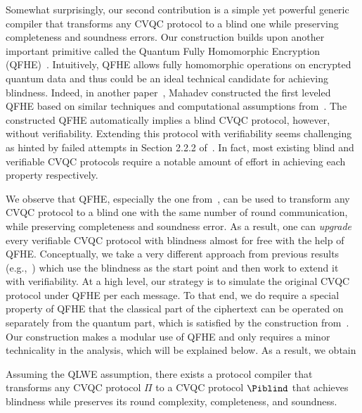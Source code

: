 Somewhat surprisingly, our second contribution is a simple yet powerful generic compiler that transforms any CVQC protocol to a blind one while preserving completeness and soundness errors.
Our construction builds upon another important primitive called the Quantum Fully Homomorphic Encryption (QFHE)~\cite{BJ15, DSS16, LC18, NS18, OTF18, mahadev_qfhe}.
Intuitively, QFHE allows fully homomorphic operations on encrypted quantum data and thus could be an ideal technical candidate for achieving blindness.
Indeed, in another paper~\cite{mahadev_qfhe}, Mahadev constructed the first leveled QFHE based on similar techniques and computational assumptions from~\cite{FOCS:Mahadev18a}.
The constructed QFHE automatically implies a blind CVQC protocol, however, without verifiability.
Extending this protocol with verifiability seems challenging as hinted by failed attempts in Section 2.2.2 of~\cite{mahadev_2018}.
In fact, most existing blind and verifiable CVQC protocols require a notable amount of effort in achieving each property respectively.

We observe that QFHE, especially the one from~\cite{mahadev_qfhe}, can be used to transform any CVQC protocol to a blind one with the same number of round communication, while preserving completeness and soundness error.
As a result, one can \emph{upgrade} every verifiable CVQC protocol with blindness almost for free with the help of QFHE.
Conceptually, we take a very different approach from previous results (e.g.,~\cite{FK17}) which use the blindness as the start point and then work to extend it with verifiability.
At a high level, our strategy is to simulate the original CVQC protocol under QFHE per each message.
To that end, we do require a special property of QFHE that the classical part of the ciphertext can be operated on separately from the quantum part, which is satisfied by the construction from~\cite{mahadev_qfhe}.
Our construction makes a modular use of QFHE and only requires a minor technicality in the analysis, which will be explained below. As a result, we obtain
\begin{theorem}[informal]
Assuming the QLWE assumption, there exists a protocol compiler that transforms any CVQC protocol $\Pi$ to a CVQC protocol $\Piblind$ that achieves blindness while preserves its round complexity, completeness, and soundness.
\end{theorem}





